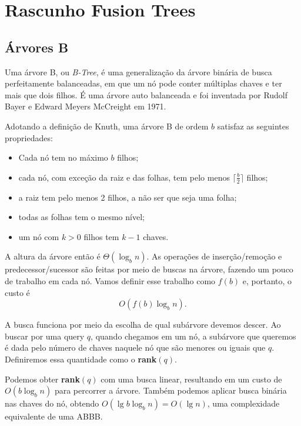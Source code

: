 \chapter{Rascunho Fusion Trees}
\label{cap:rascunho-fusion}

\section{Árvores B}

Uma árvore B, ou \textit{B-Tree}, é uma generalização da árvore binária de busca
perfeitamente balanceadas, em que um nó pode conter múltiplas chaves e ter mais
que dois filhos. É uma árvore auto balanceada e foi inventada por Rudolf Bayer e
Edward Meyers McCreight em 1971. 

Adotando a definição de Knuth, uma árvore B de ordem $b$ satisfaz as seguintes
propriedades:
\begin{itemize}
\item Cada nó tem no máximo $b$ filhos;
\item cada nó, com exceção da raiz e das folhas, tem pelo menos $\lceil
\frac{b}{2} \rceil$ filhos;
\item a raiz tem pelo menos 2 filhos, a não ser que seja uma folha;
\item todas as folhas tem o mesmo nível;
\item um nó com $k > 0$ filhos tem $k-1$ chaves.
\end{itemize}

A altura da árvore então é $\Theta(\log_b n)$. As operações de inserção/remoção
e predecessor/sucessor são feitas por meio de buscas na árvore, fazendo um pouco
de trabalho em cada nó. Vamos definir esse trabalho como $f(b)$ e, portanto, o
custo é 
\[
O(f(b) \log_b n).
\]

A busca funciona por meio da escolha de qual subárvore devemos descer. Ao buscar
por uma query $q$, quando chegamos em um nó, a subárvore que queremos é dada
pelo número de chaves naquele nó que são menores ou iguais que $q$. Definiremos
essa quantidade como o \textbf{rank}$(q)$. 

Podemos obter \textbf{rank}$(q)$ com uma busca linear, resultando em um custo de
$O(b \log_b n)$ para percorrer a árvore. Também podemos aplicar busca binária
nas chaves do nó, obtendo $O(\lg b \log_b n)=O(\lg n)$, uma complexidade
equivalente de uma ABBB.

